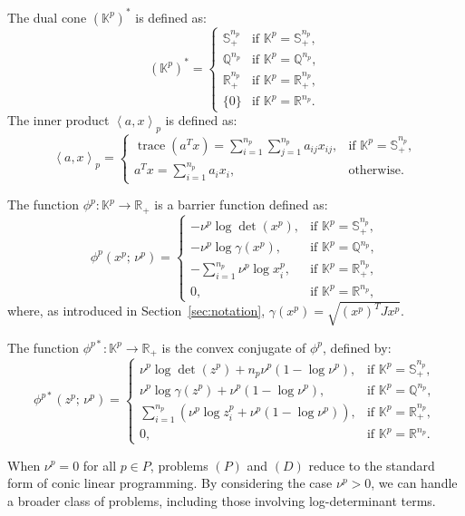 The dual cone $(\mathbb{K}^p)^*$ is defined as:
\[
(\mathbb{K}^p)^* = 
\begin{cases}
    \mathbb{S}_{+}^{n_p} & \text{if } \mathbb{K}^{p} = \mathbb{S}_{+}^{n_p},\\
    \mathbb{Q}^{n_p}     & \text{if } \mathbb{K}^{p} = \mathbb{Q}^{n_p},\\
    \mathbb{R}_{+}^{n_p} & \text{if } \mathbb{K}^{p} = \mathbb{R}_{+}^{n_p},\\
    \{0\}                & \text{if } \mathbb{K}^{p} = \mathbb{R}^{n_p}.
\end{cases}
\]
The inner product $\left\langle a, x \right\rangle_p$ is defined as:
\[
\left\langle a, x \right\rangle_p = 
\begin{cases}
    \operatorname{trace}(a^T x) 
    = \sum_{i=1}^{n_p} \sum_{j=1}^{n_p} a_{ij} x_{ij}, 
    & \text{if } \mathbb{K}^p = \mathbb{S}_{+}^{n_p},\\[6pt]
    a^T x = \sum_{i=1}^{n_p} a_i x_i, 
    & \text{otherwise}.
\end{cases}
\]

The function $\phi^p : \mathbb{K}^p \to \mathbb{R}_+$ is a barrier function defined as:
\[
\phi^p(x^p;\, \nu^p) =
\begin{cases}
    -\nu^p \log \det(x^p), & \text{if } \mathbb{K}^{p} = \mathbb{S}_{+}^{n_p},\\
    -\nu^p \log \gamma(x^p), & \text{if } \mathbb{K}^{p} = \mathbb{Q}^{n_p},\\
    -\sum_{i=1}^{n_p} \nu^p \log x^p_i, & \text{if } \mathbb{K}^{p} = \mathbb{R}_{+}^{n_p},\\
    0, & \text{if } \mathbb{K}^{p} = \mathbb{R}^{n_p},
\end{cases}
\]
where, as introduced in Section~\ref{sec:notation}, $\gamma(x^p) = \sqrt{(x^p)^T J x^p}$.

The function $\phi^{p*} : \mathbb{K}^p \to \mathbb{R}_+$ is the convex conjugate of $\phi^p$, defined by:
\[
\phi^{p*}(z^p;\, \nu^p) =
\begin{cases}
    \nu^p \log \det(z^p) + n_p \nu^p (1 - \log \nu^p), 
    & \text{if } \mathbb{K}^{p} = \mathbb{S}_{+}^{n_p},\\[4pt]
    \nu^p \log \gamma(z^p) + \nu^p (1 - \log \nu^p), 
    & \text{if } \mathbb{K}^{p} = \mathbb{Q}^{n_p},\\[4pt]
    \sum_{i=1}^{n_p} \left( \nu^p \log z^p_i + \nu^p (1 - \log \nu^p) \right), 
    & \text{if } \mathbb{K}^{p} = \mathbb{R}_{+}^{n_p},\\[3pt]
    0, & \text{if } \mathbb{K}^{p} = \mathbb{R}^{n_p}.
\end{cases}
\]

When $\nu^p = 0$ for all $p \in P$, problems $(P)$ and $(D)$ reduce to the standard form of conic linear programming. By considering the case $\nu^p > 0$, we can handle a broader class of problems, including those involving log-determinant terms.